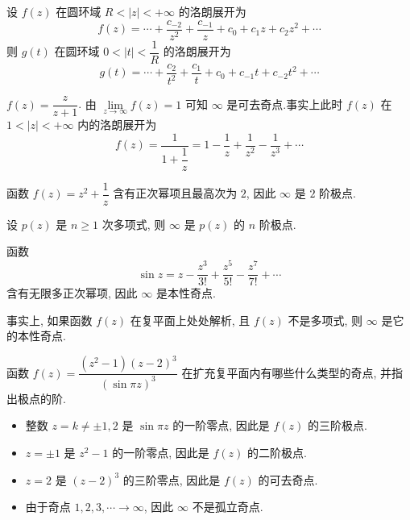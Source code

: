 \documentclass[nocolor,theme=doremi,lang=cn,11pt,chinese,twoside,openright,usesamecnt]{elegantbook}
\begin{document}
设 $f(z)$ 在圆环域 $R<|z|<+\infty$ 的洛朗展开为
\[f(z)=\cdots+\frac{c_{-2}}{z^2}+\frac{c_{-1}}{z}+c_0+c_1z+c_2z^2+\cdots\]
则 $g(t)$ 在圆环域 $0<|t|<\dfrac1R$ 的洛朗展开为
\[g(t)=\cdots+\frac{c_2}{t^2}+\frac{c_1}t+c_0+c_{-1}t+c_{-2}t^2+\cdots\]

\begin{example}
		$f(z)=\dfrac z{z+1}$.
	{由 $\lim\limits_{z\to\infty}f(z)=1$ 可知 $\infty$ 是可去奇点.事实上此时 $f(z)$ 在 $1<|z|<+\infty$ 内的洛朗展开为
		\[f(z)=\frac{1}{1+\dfrac1z}=1-\frac1z+\frac1{z^2}-\frac1{z^3}+\cdots\]
	}
\end{example}

\begin{example}
		函数 $f(z)=z^2+\dfrac1z$
	{含有正次幂项且最高次为 $2$, 因此 $\infty$ 是 $2$ 阶极点.
	}
\end{example}

\begin{example}
		设 $p(z)$ 是 $n\ge1$ 次多项式,
	{则 $\infty$ 是 $p(z)$ 的 $n$ 阶极点.
	}
\end{example}

\begin{example}
		函数 
		\[\sin z=z-\frac{z^3}{3!}+\frac{z^5}{5!}-\frac{z^7}{7!}+\cdots\]
	{含有无限多正次幂项, 因此 $\infty$ 是本性奇点.
	}

	{事实上, 如果函数 $f(z)$ 在复平面上处处解析, 且 $f(z)$ 不是多项式, 则 $\infty$ 是它的本性奇点.
	}
\end{example}

\begin{example}
	函数 $f(z)=\dfrac{(z^2-1)(z-2)^3}{(\sin{\pi z})^3}$ 在扩充复平面内有哪些什么类型的奇点, 并指出极点的阶.
\end{example}

\begin{solution}
	\begin{itemize}
		\item 整数 $z=k\neq \pm1,2$ 是 $\sin{\pi z}$ 的一阶零点, 因此是 $f(z)$ 的三阶极点.
		\item $z=\pm1$ 是 $z^2-1$ 的一阶零点, 因此是 $f(z)$ 的二阶极点.
		\item $z=2$ 是 $(z-2)^3$ 的三阶零点, 因此是 $f(z)$ 的可去奇点.
		\item 由于奇点 $1,2,3,\cdots\to \infty$, 因此 $\infty$ 不是孤立奇点.
	\end{itemize}
\end{solution}
\end{document}
